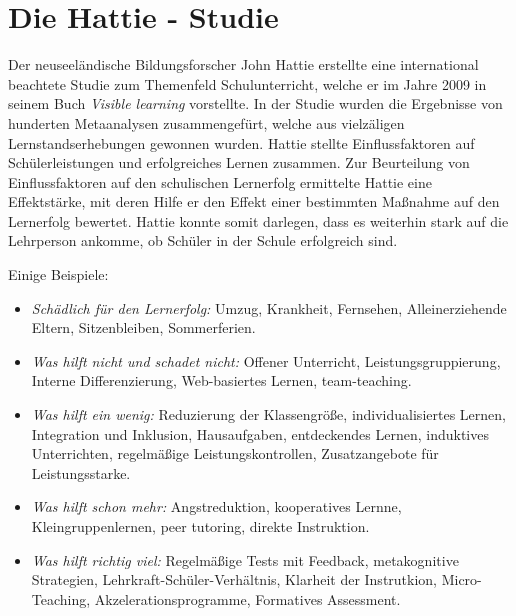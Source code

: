 \bip\bip
\section{Die Hattie - Studie}
Der neuseel{\"a}ndische Bildungsforscher John Hattie erstellte eine international beachtete Studie zum Themenfeld {\glqq}Schulunterricht{\grqq}, 
welche er im Jahre 2009 in seinem Buch \emph{Visible learning} vorstellte. In der Studie wurden die Ergebnisse von hunderten Metaanalysen zusammengef{\"u}rt,
welche aus vielz{\"a}ligen Lernstandserhebungen gewonnen wurden. Hattie stellte Einflussfaktoren auf Sch{\"u}lerleistungen und erfolgreiches Lernen zusammen. 
\mip
Zur Beurteilung von Einflussfaktoren auf den schulischen Lernerfolg ermittelte Hattie eine Effektst{\"a}rke, mit deren Hilfe er den Effekt einer 
bestimmten Ma{\ss}nahme auf den Lernerfolg bewertet. Hattie konnte somit darlegen, dass es weiterhin stark auf die Lehrperson ankomme, 
ob Sch{\"u}ler in der Schule erfolgreich sind.
\mip

Einige Beispiele:
\begin{itemize}
\item
{\emph{Sch{\"a}dlich f{\"u}r den Lernerfolg:}} Umzug, Krankheit, Fernsehen, Alleinerziehende Eltern, Sitzenbleiben, Sommerferien.
\item
{\emph{Was hilft nicht und schadet nicht:}} Offener Unterricht, Leistungsgruppierung, Interne Differenzierung, Web-basiertes Lernen, team-teaching.
\item
{\emph{Was hilft ein wenig:}} Reduzierung der Klassengr{\"o}{\ss}e, individualisiertes Lernen, Integration und Inklusion, Hausaufgaben, entdeckendes Lernen, induktives Unterrichten, regelm{\"a}{\ss}ige Leistungskontrollen, Zusatzangebote f{\"u}r Leistungsstarke.
\item
{\emph{Was hilft schon mehr:}} Angstreduktion, kooperatives Lernne, Kleingruppenlernen, peer tutoring, direkte Instruktion.
\item
{\emph{Was hilft richtig viel:}} Regelm{\"a}{\ss}ige Tests mit Feedback, metakognitive Strategien, Lehrkraft-Sch{\"u}ler-Verh{\"a}ltnis, Klarheit der Instrutkion, Micro-Teaching, Akzelerationsprogramme, Formatives Assessment. 
\end{itemize}



